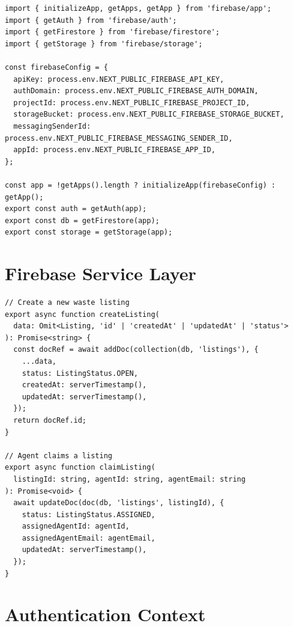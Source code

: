 \documentclass[a4paper,12pt,oneside]{report}
\begin{document}
\begin{lstlisting}[caption={Firebase Initialization (firebase.ts)}, label={lst:firebase}]
import { initializeApp, getApps, getApp } from 'firebase/app';
import { getAuth } from 'firebase/auth';
import { getFirestore } from 'firebase/firestore';
import { getStorage } from 'firebase/storage';

const firebaseConfig = {
  apiKey: process.env.NEXT_PUBLIC_FIREBASE_API_KEY,
  authDomain: process.env.NEXT_PUBLIC_FIREBASE_AUTH_DOMAIN,
  projectId: process.env.NEXT_PUBLIC_FIREBASE_PROJECT_ID,
  storageBucket: process.env.NEXT_PUBLIC_FIREBASE_STORAGE_BUCKET,
  messagingSenderId: process.env.NEXT_PUBLIC_FIREBASE_MESSAGING_SENDER_ID,
  appId: process.env.NEXT_PUBLIC_FIREBASE_APP_ID,
};

const app = !getApps().length ? initializeApp(firebaseConfig) : getApp();
export const auth = getAuth(app);
export const db = getFirestore(app);
export const storage = getStorage(app);
\end{lstlisting}

\section{Firebase Service Layer}

\begin{lstlisting}[caption={Core Service Functions (firebase-service.ts)}, label={lst:service}]
// Create a new waste listing
export async function createListing(
  data: Omit<Listing, 'id' | 'createdAt' | 'updatedAt' | 'status'>
): Promise<string> {
  const docRef = await addDoc(collection(db, 'listings'), {
    ...data,
    status: ListingStatus.OPEN,
    createdAt: serverTimestamp(),
    updatedAt: serverTimestamp(),
  });
  return docRef.id;
}

// Agent claims a listing
export async function claimListing(
  listingId: string, agentId: string, agentEmail: string
): Promise<void> {
  await updateDoc(doc(db, 'listings', listingId), {
    status: ListingStatus.ASSIGNED,
    assignedAgentId: agentId,
    assignedAgentEmail: agentEmail,
    updatedAt: serverTimestamp(),
  });
}
\end{lstlisting}

\section{Authentication Context}
\end{document}
